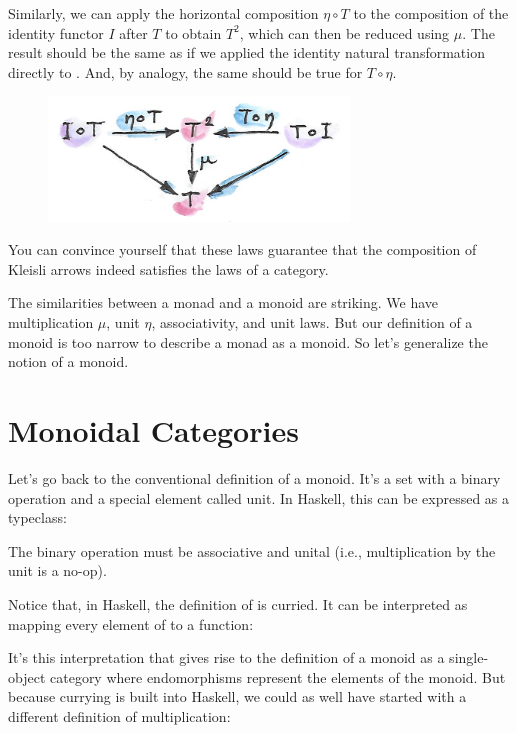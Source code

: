 \noindent
Similarly, we can apply the horizontal composition $\eta \circ T$ to the
composition of the identity functor $I$ after $T$ to
obtain $T^2$, which can then be reduced using $\mu$. The
result should be the same as if we applied the identity natural
transformation directly to . And, by analogy, the same should
be true for $T \circ \eta$.

\begin{figure}[H]
\centering
\includegraphics[width=80mm]{images/unitlawcomp-1.png}
\end{figure}

\noindent
You can convince yourself that these laws guarantee that the composition
of Kleisli arrows indeed satisfies the laws of a category.

The similarities between a monad and a monoid are striking. We have
multiplication $\mu$, unit $\eta$, associativity, and unit laws. But our
definition of a monoid is too narrow to describe a monad as a monoid. So
let's generalize the notion of a monoid.

\section{Monoidal Categories}

Let's go back to the conventional definition of a monoid. It's a set
with a binary operation and a special element called unit. In Haskell,
this can be expressed as a typeclass:

The binary operation  must be associative and unital
(i.e., multiplication by the unit  is a no-op).

Notice that, in Haskell, the definition of  is curried.
It can be interpreted as mapping every element of  to a
function:

It's this interpretation that gives rise to the definition of a monoid
as a single-object category where endomorphisms
 represent the elements of the monoid.
But because currying is built into Haskell, we could as well have
started with a different definition of multiplication:


